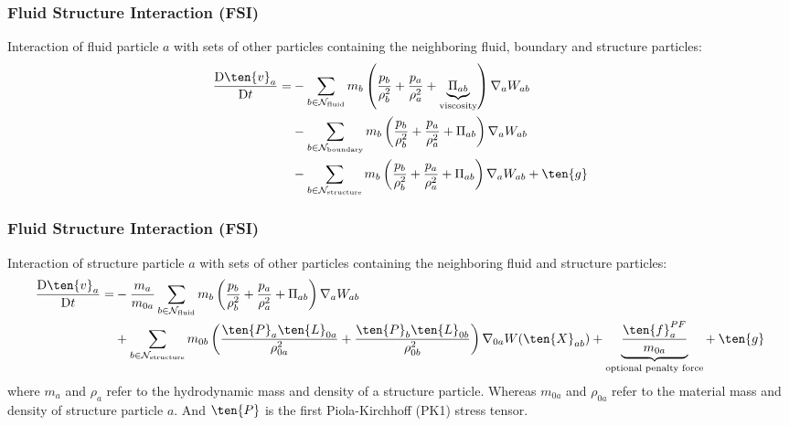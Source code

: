\begin{frame}
    \frametitle{Fluid Structure Interaction (FSI)}
    Interaction of fluid particle $a$ with sets of other particles containing the
    neighboring
    fluid, boundary and structure particles:
    \begin{align*}
        \td{\ten{v}_a}{t} = & - \sum_{b \in \mathcal{N}_{\text{fluid}}}m_b
        \left(\frac{p_b}{\rho_b^2}+\frac{p_a}{\rho_a^2} +
        \underbrace{\Pi_{ab}}_{\text{viscosity}}
        \right) \nabla_a W_{ab}                                                \\
                            & - \sum_{b \in \mathcal{N}_{\text{boundary}}}m_b
        \left(\frac{p_b}{\rho_b^2}+\frac{p_a}{\rho_a^2} +
        \Pi_{ab}\right) \nabla_a W_{ab}
        \\
                            & - \sum_{b \in \mathcal{N}_{\text{structure}}}m_b
        \left(\frac{p_b}{\rho_b^2}+\frac{p_a}{\rho_a^2} +
        \Pi_{ab}\right) \nabla_a W_{ab} + \ten{g}
    \end{align*}
\end{frame}
\begin{frame}
    \frametitle{Fluid Structure Interaction (FSI)}
    Interaction of structure particle $a$ with sets of other particles containing the
    neighboring
    fluid and structure particles:
    \begin{align*}
        \td{\ten{v}_a}{t} = & - \frac{m_a}{m_{0a}}\sum_{b \in
        \mathcal{N}_{\text{fluid}}}m_b
        \left(\frac{p_b}{\rho_b^2}+\frac{p_a}{\rho_a^2} +
        \Pi_{ab}
        \right) \nabla_a W_{ab}
        \\
                            & +\sum_{b\in \mathcal{N}_{\text{structure}}} m_{0b}
        \left( \frac{\ten{P}_a \ten{L}_{0a}}{\rho_{0a}^2} + \frac{\ten{P}_b
            \ten{L}_{0b}}{\rho_{0b}^2} \right)
        \nabla_{0a} W(\ten{X}_{ab}) +
        \underbrace{\frac{\ten{f}_a^{PF}}{m_{0a}}}_{\text{optional penalty force}} + \:
        \ten{g}
    \end{align*}
    where $m_a$ and $\rho_a$ refer to the hydrodynamic mass and density of a structure
    particle. Whereas $m_{0a}$ and $\rho_{0a}$ refer to the material mass and density of
    structure particle $a$. And $\ten{P}$ is the first Piola-Kirchhoff (PK1) stress tensor.
\end{frame}

